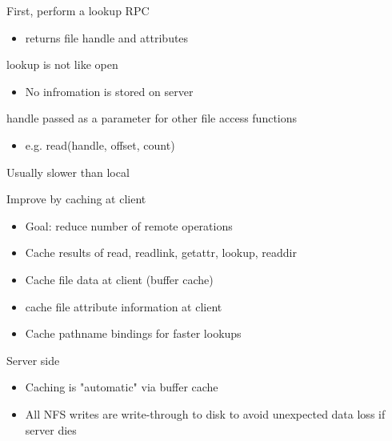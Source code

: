 \begin{slide}

	
	First, perform a lookup RPC
	\begin{itemize}
		\item returns file handle and attributes
	\end{itemize}
	\bigskip
	
	lookup is not like open
	\begin{itemize}
		\item No infromation is stored on server
	\end{itemize}
	
	handle passed as a parameter for other file access functions
	\begin{itemize}
		\item e.g. read(handle, offset, count)
	\end{itemize}

\end{slide}

\begin{slide}

	
	Usually slower than local
	\bigskip
	
	Improve by caching at client
	\begin{itemize}
		\item Goal: reduce number of remote operations
		\item Cache results of read, readlink, getattr, lookup, readdir
		\item Cache file data at client (buffer cache)
		\item cache file attribute information at client
		\item Cache pathname bindings for faster lookups
	\end{itemize}
	\bigskip
	
	Server side
	\begin{itemize}
		\item Caching is "automatic" via buffer cache
		\item All NFS writes are write-through to disk to avoid unexpected data loss if server dies
	\end{itemize}

\end{slide}

